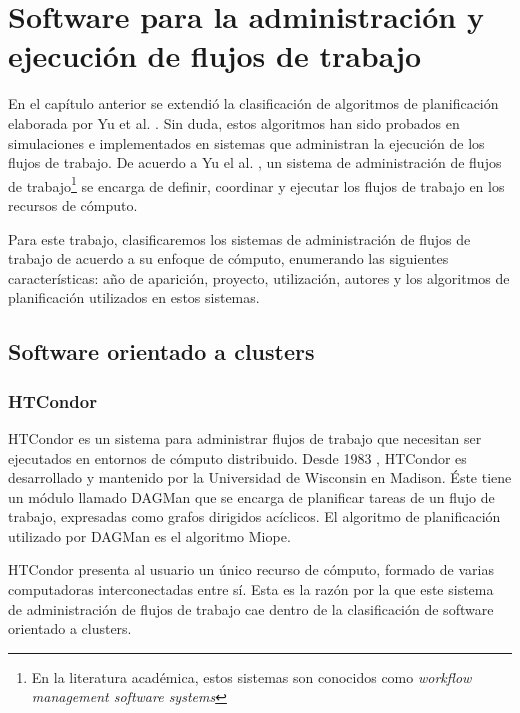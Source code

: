 \chapter[Software para flujos de trabajo]{Software para la administración y ejecución de flujos de trabajo}

En el capítulo anterior se extendió la clasificación de algoritmos de planificación elaborada por Yu et al. \cite{yu2008workflow}. Sin duda, estos algoritmos han sido probados en simulaciones e implementados en sistemas que administran la ejecución de los flujos de trabajo. De acuerdo a Yu el al. \cite{yu2008workflow}, un sistema de administración de flujos de trabajo\footnote{En la literatura académica, estos sistemas son conocidos como \emph{workflow management software systems}} se encarga de definir, coordinar y ejecutar los flujos de trabajo en los recursos de cómputo.

Para este trabajo, clasificaremos los sistemas de administración de flujos de trabajo de acuerdo a su enfoque de cómputo, enumerando las siguientes características: año de aparición, proyecto, utilización, autores y los algoritmos de planificación utilizados en estos sistemas.

\section{Software orientado a clusters}


\subsection{HTCondor}

HTCondor \cite{condor-practice} es un sistema para administrar flujos de trabajo que necesitan ser ejecutados en entornos de cómputo distribuido. Desde 1983 \cite{htcondor2014webpage}, HTCondor es desarrollado y mantenido por la Universidad de Wisconsin en Madison. Éste tiene un módulo llamado DAGMan que se encarga de planificar tareas de un flujo de trabajo, expresadas como grafos dirigidos acíclicos. El algoritmo de planificación utilizado por DAGMan es el algoritmo Miope. 

HTCondor presenta al usuario un único recurso de cómputo, formado de varias computadoras interconectadas entre sí. Esta es la razón por la que este sistema de administración de flujos de trabajo cae dentro de la clasificación de software orientado a clusters.

